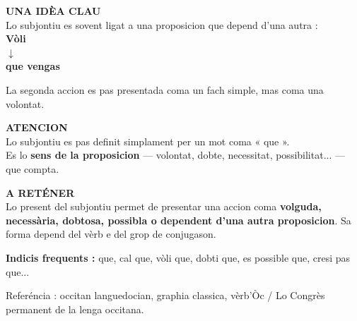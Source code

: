 \documentclass[a4paper,11pt]{article}
\begin{document}
\begin{minipage}{0.91\textwidth}
\vspace{2mm}
\begin{minipage}{0.485\textwidth}
\begin{greenbox}[height=3.25cm]
\textbf{\color{GreenDark}UNA IDÈA CLAU}\\[1mm]
Lo subjontiu es sovent ligat a una proposicion que depend d'una autra :\\[1mm]
\centering
\textbf{Vòli}\\
$\downarrow$\\
\textbf{que vengas}\\[1mm]
\raggedright
La segonda accion es pas presentada coma un fach simple, mas coma una volontat.
\end{greenbox}
\end{minipage}\hfill
\begin{minipage}{0.485\textwidth}
\begin{warnbox}[height=3.25cm]
\textbf{\color{Red}ATENCION}\\[1mm]
Lo subjontiu es pas definit simplament per un mot coma « que ».\\[1mm]
Es lo \textbf{sens de la proposicion} — volontat, dobte, necessitat, possibilitat... — que compta.
\end{warnbox}
\end{minipage}

\vspace{2mm}
\begin{greenbox}
\textbf{\color{GreenDark}A RETÉNER}\\[1mm]
Lo present del subjontiu permet de presentar una accion coma \textbf{volguda, necessària,
dobtosa, possibla o dependent d'una autra proposicion}. Sa forma depend del vèrb e del grop de conjugason.
\end{greenbox}

\vspace{1.5mm}\centering
{\small\color{Grey}\textbf{Indicis frequents :} que, cal que, vòli que, dobti que, es possible que, cresi pas que...}

\vspace{1mm}
{\scriptsize\color{Grey}Referéncia : occitan languedocian, graphia classica, vèrb'Òc / Lo Congrès permanent de la lenga occitana.}

\end{minipage}
\end{document}
